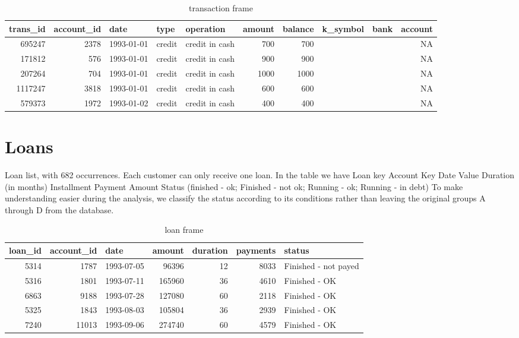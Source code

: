\documentclass[]{book}
\begin{document}
\begin{table}[t]

\caption{\label{tab:unnamed-chunk-8}transaction frame}
\centering
\begin{tabular}{r|r|l|l|l|r|r|l|l|r}
\hline
trans\_id & account\_id & date & type & operation & amount & balance & k\_symbol & bank & account\\
\hline
695247 & 2378 & 1993-01-01 & credit & credit in cash & 700 & 700 &  &  & NA\\
\hline
171812 & 576 & 1993-01-01 & credit & credit in cash & 900 & 900 &  &  & NA\\
\hline
207264 & 704 & 1993-01-01 & credit & credit in cash & 1000 & 1000 &  &  & NA\\
\hline
1117247 & 3818 & 1993-01-01 & credit & credit in cash & 600 & 600 &  &  & NA\\
\hline
579373 & 1972 & 1993-01-02 & credit & credit in cash & 400 & 400 &  &  & NA\\
\hline
\end{tabular}
\end{table}

\section{Loans}\label{loans}

Loan list, with 682 occurrences. Each customer can only receive one
loan. In the table we have Loan key Account Key Date Value Duration (in
months) Installment Payment Amount Status (finished - ok; Finished - not
ok; Running - ok; Running - in debt) To make understanding easier during
the analysis, we classify the status according to its conditions rather
than leaving the original groups A through D from the database.

\begin{table}[t]

\caption{\label{tab:unnamed-chunk-9}loan frame}
\centering
\begin{tabular}{r|r|l|r|r|r|l}
\hline
loan\_id & account\_id & date & amount & duration & payments & status\\
\hline
5314 & 1787 & 1993-07-05 & 96396 & 12 & 8033 & Finished - not payed\\
\hline
5316 & 1801 & 1993-07-11 & 165960 & 36 & 4610 & Finished - OK\\
\hline
6863 & 9188 & 1993-07-28 & 127080 & 60 & 2118 & Finished - OK\\
\hline
5325 & 1843 & 1993-08-03 & 105804 & 36 & 2939 & Finished - OK\\
\hline
7240 & 11013 & 1993-09-06 & 274740 & 60 & 4579 & Finished - OK\\
\hline
\end{tabular}
\end{table}
\end{document}
